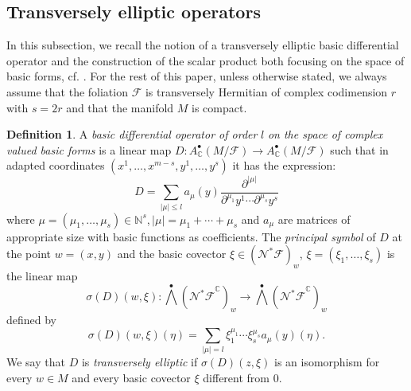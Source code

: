 \documentclass[12pt]{amsart}
\numberwithin{equation}{section}
\theoremstyle{definition}
\theoremstyle{definition}
\newtheorem{definition}  [theorem]     {Definition}
\theoremstyle{definition}
\renewcommand{\1}{\mathsf{1}}
\renewcommand{\>}{\rightarrow}
\def\mb{\mathbb}
\def\mc{\mathcal}
\theoremstyle{plain} %
\theoremstyle{plain} %
\theoremstyle{plain} %
\begin{document}
	\subsection{Transversely elliptic operators}
	In this subsection, we recall the notion of a transversely elliptic basic differential operator and the construction of the scalar product both  focusing on the space of  basic forms, cf. \cite{EKA90}. For the rest of this paper, unless otherwise stated, we always assume that the foliation $\mc F$ is transversely Hermitian of complex codimension $r$ with $s=2r$ and that the manifold $M$ is compact.
	\begin{definition}\label{basic differential operator}
		A \textit{basic differential operator of order} $l$ \textit{on the space of complex valued basic forms} is a linear map $D: A^{\bullet}_\mb C(M /\mathcal{F}) \rightarrow A^{\bullet}_\mb C(M /\mathcal{F})$ such that in adapted coordinates $\left(x^{1}, \ldots, x^{m-s}, y^{1}, \ldots, y^{s}\right)$  it has the expression:
		$$
		D=\sum_{|\mu| \leq l} a_{\mu}(y) \frac{\partial^{|\mu|}}{\partial ^{\mu _1} y^{1} \cdots \partial^{\mu_s} y^{s}}
		$$
		where $\mu=\left(\mu_1,\ldots,\mu_s\right)\in\mb N^s$,\,$|\mu|=\mu_ 1+\cdots+\mu_s$ and $a_{\mu}$ are matrices of appropriate size with basic functions as coefficients.
		The \textit{principal symbol} of $D$ at the point $w=(x, y)$ and the basic
		covector $\xi \in ({\mathcal N^{*} \mathcal{F}})_w$, $\xi=\left(\xi_1,\ldots,\xi_{s}\right)$ is the linear map $$\sigma(D)(w, \xi): \bigwedge^\bullet({\mathcal N^{*} \mathcal{F}}^\mb C)_w \longrightarrow \bigwedge^\bullet({\mathcal N^{*} \mathcal{F}}^\mb C)_w$$ defined by
		$$\sigma(D)(w, \xi)(\eta)=\sum_{|\mu|=l} \xi_{1}^{\mu_{1}} \cdots \xi_{s}^{\mu_{s}} a_{\mu}(y)(\eta).$$
		We say that $D$ is \textit{transversely elliptic} if $\sigma(D)(z, \xi)$ is an isomorphism for every $w \in M$ and every basic covector $\xi$ different from $0$.
	\end{definition}
	
\end{document}
